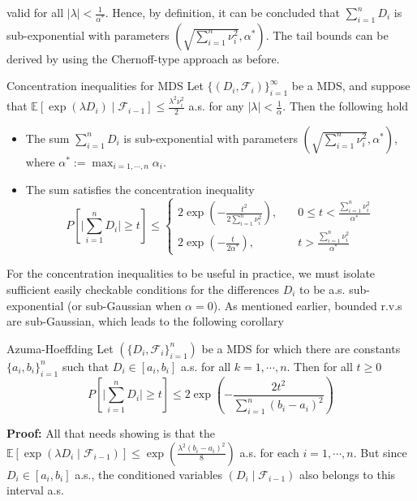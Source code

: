 \documentclass[10pt,handout,english]{beamer}
\newcommand{\E}{\mathbb{E}}
\newcommand{\F}{\mathcal{F}}
\newcommand{\1}{\mathbbm{1}}
\begin{document}
\begin{frame}[allowframebreaks]
\[\]
valid for all $\lvert\lambda\rvert< \frac{1}{\alpha^*}$. Hence, by definition, it can be concluded that $\sum_{i=1}^nD_i$ is sub-exponential with parameters $(\sqrt{\sum_{i=1}^n\nu_i^2},\alpha^*)$.  The tail bounds can be derived by using the Chernoff-type approach as before.
\begin{block}{Concentration inequalities for MDS}
Let $\{(D_i,\F_i)\}_{i=1}^{\infty}$ be a MDS, and suppose that $\E[\exp(\lambda D_i)\mid\F_{i-1}]\leq\frac{\lambda^2\nu_i^2}{2}$ a.s. for any $\lvert\lambda\rvert<\frac{1}{\alpha}$. Then the following hold
\begin{itemize}
\item The sum $\sum_{i=1}^{n}D_i$ is sub-exponential with parameters $\left(\sqrt{\sum_{i=1}^{n}\nu_i^2},\alpha^*\right)$, where $\alpha^*:=\max_{i=1,\cdots,n}\alpha_i$.
\item The sum satisfies the concentration inequality
\[
P\left[\lvert \sum\limits_{i=1}^nD_i\rvert\geq t\right]\leq
\begin{cases}
2\exp\left(-\frac{t^2}{2\sum_{i=1}^{n}\nu_i^2}\right),\quad &0\leq t<\frac{\sum_{i=1}^{n}\nu_i^2}{\alpha^*}\\
2\exp\left(-\frac{t}{2\alpha^*}\right),\quad &t>\frac{\sum_{i=1}^{n}\nu_i^2}{\alpha^*}
\end{cases}
\]
\end{itemize}
\end{block}
For the concentration inequalities to be useful in practice, we must isolate sufficient easily checkable conditions for the differences $D_i$ to be a.s. sub-exponential (or sub-Gaussian when $\alpha=0$). As mentioned earlier, bounded r.v.s are sub-Gaussian, which leads to the following corollary
\begin{block}{Azuma-Hoeffding}
Let $(\{D_i,\F_i\}_{i=1}^{n})$ be a MDS for which there are constants $\{a_i,b_i\}_{i=1}^n$ such that $D_i\in[a_i,b_i]$ a.s. for all $k=1,\cdots,n$. Then for all $t\geq0$
\[
P\left[\lvert\sum\limits_{i=1}^{n}D_i\rvert\geq t\right]\leq2\exp\left(-\frac{2t^2}{\sum_{i=1}^{n}(b_i-a_i)^2}\right)
\]
\end{block}

\textbf{Proof:}
All that needs showing is that the $\E[\exp(\lambda D_i\mid\F_{i-1})]\leq\exp\left(\frac{\lambda^2(b_i-a_i)^2}{8}\right)$ a.s. for each $i=1,\cdots,n$. But since $D_i\in[a_i,b_i]$ a.s., the conditioned variables $(D_i\mid\F_{i-1})$ also belongs to this interval a.s.
\end{frame}
\end{document}
